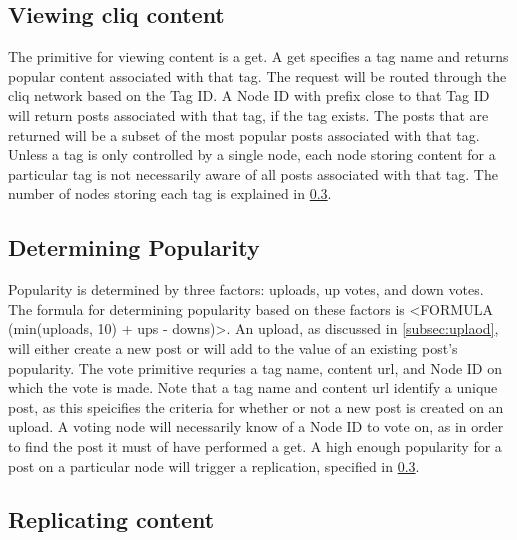 \documentclass[11pt,twocolumn]{article}
\begin{document}
\subsection{Viewing cliq content}

The primitive for viewing content is a get. 
A get specifies a tag name and returns popular content associated with that tag. 
The request will be routed through the cliq network based on the Tag ID. 
A Node ID with prefix close to that Tag ID will return posts associated with that tag, if the tag exists. 
The posts that are returned will be a subset of the most popular posts associated with that tag. 
Unless a tag is only controlled by a single node, each node storing content for a particular tag is not necessarily aware of all posts associated with that tag. 
The number of nodes storing each tag is explained in \ref{subsec:replication}. 

\subsection{Determining Popularity}
\label{subsec:popularity}

Popularity is determined by three factors: uploads, up votes, and down votes. 
The formula for determining popularity based on these factors is <FORMULA (min(uploads, 10) + ups - downs)>.
An upload, as discussed in \ref{subsec:uplaod}, will either create a new post or will add to the value of an existing post's popularity. 
The vote primitive requries a tag name, content url, and Node ID on which the vote is made. 
Note that a tag name and content url identify a unique post, as this speicifies the criteria for whether or not a new post is created on an upload. 
A voting node will necessarily know of a Node ID to vote on, as in order to find the post it must of have performed a get. 
A high enough popularity for a post on a particular node will trigger a replication, specified in \ref{subsec:replication}. 

\subsection{Replicating content}
\label{subsec:replication}
\end{document}
